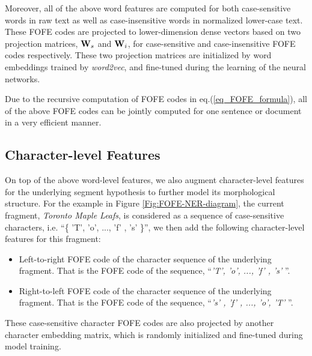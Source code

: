 \documentclass[11pt,a4paper]{article}
\begin{document}
Moreover, all of the above word features are computed for both case-sensitive words in raw text as well as case-insensitive words in normalized lower-case text. These FOFE codes are projected to lower-dimension dense vectors based on two projection matrices, ${\bf W}_s$ and ${\bf W}_i$, for case-sensitive and case-insensitive FOFE codes respectively. These two projection matrices are initialized by word embeddings trained by {\it word2vec}, and fine-tuned during the learning of the neural networks. 

Due to the recursive computation of FOFE codes in eq.(\ref{eq_FOFE_formula}), all of the above FOFE codes can be jointly computed for one sentence or document in a very efficient manner. 


\subsection{Character-level Features}

On top of the above word-level features, we also augment character-level features for the underlying segment hypothesis to further model its morphological structure. For the example in Figure \ref{Fig:FOFE-NER-diagram}, the current fragment, {\it Toronto Maple Leafs}, is considered as a sequence of case-sensitive characters, i.e. ``\{ 'T', 'o', ..., 'f' , 's'  \}'', we then add the following character-level features for this fragment:

\begin{itemize}
	\item Left-to-right FOFE code of the character sequence of the underlying fragment. That is the FOFE code of the sequence, ``{\it  'T', 'o', ..., 'f' , 's' }''.
	
	\item Right-to-left FOFE code of the character sequence of the underlying fragment. That is the FOFE code of the sequence, ``{\it 's' ,  'f' , ..., 'o',  'T' }''.
\end{itemize}

These case-sensitive character FOFE codes are also projected by another character embedding matrix, which is randomly initialized and fine-tuned during model training. 
\end{document}
